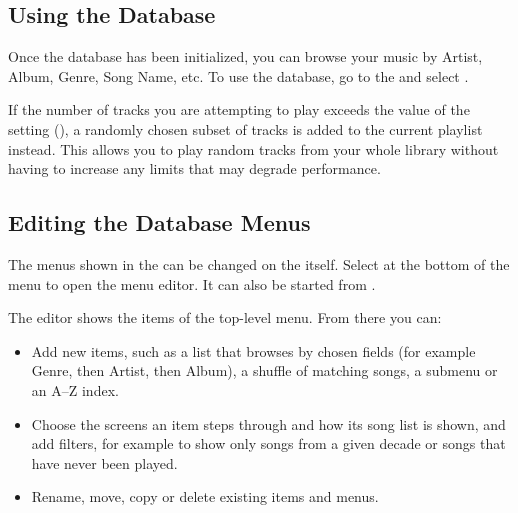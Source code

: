 \subsection{Using the Database}
Once the database has been initialized, you can browse your music 
by Artist, Album, Genre, Song Name, etc.  To use the database, go to the
  and select .\\

%

If the number of tracks you are attempting to play exceeds the value of the
 setting (), a randomly chosen
subset of tracks is added to the current playlist instead. This allows you
to play random tracks from your whole library without having to increase any
limits that may degrade performance.


\subsection{\label{ref:editdatabasemenus}Editing the Database Menus}
The menus shown in the  can be changed on the \dap{} itself.
Select  at the bottom of the  menu to
open the menu editor. It can also be started from
.

The editor shows the items of the top-level menu. From there you can:
\begin{itemize}
  \item Add new items, such as a list that browses by chosen fields
    (for example Genre, then Artist, then Album), a shuffle of matching
    songs, a submenu or an A--Z index.
  \item Choose the screens an item steps through and how its song list is
    shown, and add filters, for example to show only songs from a given
    decade or songs that have never been played.
  \item Rename, move, copy or delete existing items and menus.
\end{itemize}

